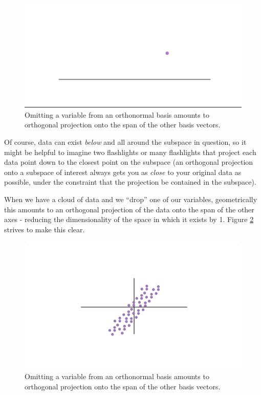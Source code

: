 \documentclass[
]{article}
\theoremstyle{definition}
\theoremstyle{definition}
\theoremstyle{definition}
\theoremstyle{definition}
\theoremstyle{remark}
\begin{document}
\begin{figure}

{\centering \includegraphics[width=1\linewidth]{figs/orthogproganimlow} 

}

\caption{Omitting a variable from an orthonormal basis amounts to orthogonal projection onto the span of the other basis vectors.}\label{fig:orthogproganim}
\end{figure}

Of course, data can exist \emph{below} and all around the subspace in question, so it might be helpful to imagine two flashlights or many flashlights that project each data point down to the closest point on the subspace (an orthogonal projection onto a subspace of interest always gets you as \emph{close} to your original data as possible, under the constraint that the projection be contained in the subspace).

When we have a cloud of data and we ``drop'' one of our variables, geometrically this amounts to an orthogonal projection of the data onto the span of the other axes - reducing the dimensionality of the space in which it exists by 1. Figure \ref{fig:orthogproganim2} strives to make this clear.

\begin{figure}

{\centering \includegraphics[width=1\linewidth]{figs/orthogproganim2} 

}

\caption{Omitting a variable from an orthonormal basis amounts to orthogonal projection onto the span of the other basis vectors.}\label{fig:orthogproganim2}
\end{figure}
\end{document}
